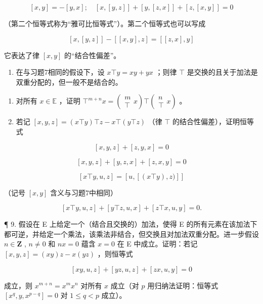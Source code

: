\[
[ x, y ] = - [ y, x ]; \quad [ x, [ y, z ] ] + [ y, [ z, x ] ] + [ z, [ x, y ] ] = 0
\]

（第二个恒等式称为“雅可比恒等式”）。第二个恒等式也可以写成

\[
[ x, [ y, z ] ] - [ [ x, y ], z ] = [ [ z, x ], y ]
\]

它表达了律 \([x, y]\) 的“结合性偏差”。

\begin{enumerate}
\def\labelenumi{\arabic{enumi}.}
\setcounter{enumi}{7}
\tightlist
\item
  在与习题7相同的假设下，设 \(x \top y = xy + yx\) ；则律 \(\top\) 是交换的且关于加法是双重分配的，但一般不是结合的。
\end{enumerate}

\begin{enumerate}
\def\labelenumi{(\alph{enumi})}
\item
  对所有 \(x \in \mathbb{E}\) ，证明 \(\top^{m+n} x = \left( \begin{array}{c} m \\ \top \end{array} x \right) \top \left( \begin{array}{c} n \\ \top \end{array} x \right)\) 。
\item
  若记 \([x, y, z] = (x \top y) \top z - x \top (y \top z)\) （律 \(\top\) 的结合性偏差），证明恒等式
\end{enumerate}

\[
[ x, y, z ] + [ z, y, x ] = 0
\]

\[
[ x, y, z ] + [ y, z, x ] + [ z, x, y ] = 0
\]

\[
[ x \top y, u, z ] = [ u, [ (x \top y), z) ] ]
\]

（记号 \([x, y]\) 含义与习题7中相同）

\[
[ x \top y, u, z ] + [ y \top z, u, x ] + [ z \top x, u, y ] = 0.
\]

¶ 9. 假设在 E 上给定一个（结合且交换的）加法，使得 E 的所有元素在该加法下都可逆，并给定一个乘法，该乘法非结合，但交换且对加法双重分配。进一步假设 \(n \in \mathbf{Z}\) , \(n \neq 0\) 和 \(nx = 0\) 蕴含 \(x = 0\) 在 E 中成立。证明：若记 \([x, y, z] = (xy)z - x(yz)\) ，则恒等式

\[
[ x y, u, z ] + [ y z, u, z ] + [ z x, u, y ] = 0
\]

成立，则 \(x^{m + n} = x^m x^n\) 对所有 \(x\) 成立（对 \(p\) 用归纳法证明：恒等式 \([x^q, y, x^{p - q}] = 0\) 对 \(1 \leqslant q < p\) 成立）。

